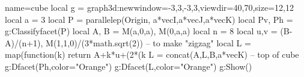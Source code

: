 \documentclass[border=5pt]{standalone}
\begin{document}
%
\begin{luadraw}{name=cube}
local g = graph3d:new{window={-3,3,-3,3},viewdir={40,70},size={12,12}}
local a = 3
local P = parallelep(Origin, a*vecI,a*vecJ,a*vecK)
local Pv, Ph = g:Classifyfacet(P)
local A, B = M(a,0,a), M(0,a,a)
local n = 8
local u,v = (B-A)/(n+1), M(1,1,0)/(3*math.sqrt(2)) -- to make "zigzag"
local L = map(function(k) return A+k*u+(2*(k%
L = concat({A},L,{B,a*vecK}) -- top of cube
g:Dfacet(Ph,{color="Orange"})
g:Dfacet(L,{color="Orange"})
g:Show()
\end{luadraw}
\end{document}
